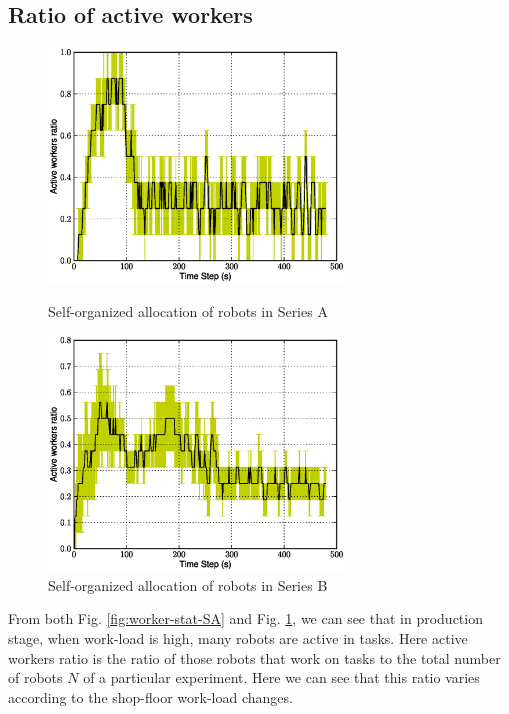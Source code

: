 \documentclass[smallcondensed]{svjour3}
\begin{document}
\subsection*{Ratio of active workers}
\begin{figure}
\centering
\includegraphics[width=0.7\textwidth, angle=0]
{images/global-8robots/Plasticity-8robots2tasks.eps}
\caption{\small Self-organized allocation of robots in Series A}
\label{fig:worker-stat-SA}
%
\centering
\includegraphics[width=0.7\textwidth, angle=0]{images/WorkerRatio.eps}
\caption{\small Self-organized allocation of robots in Series B }
\label{fig:worker-stat-SB} %
\end{figure}
From both Fig. \ref{fig:worker-stat-SA} and Fig. \ref{fig:worker-stat-SB}, we can  see that in production stage, when work-load is high, many robots are active in tasks. Here active workers ratio is the ratio of those robots that work on tasks to the total number of robots $N$ of a particular experiment.   Here we can see that this ratio varies according to the shop-floor work-load changes.
\end{document}
